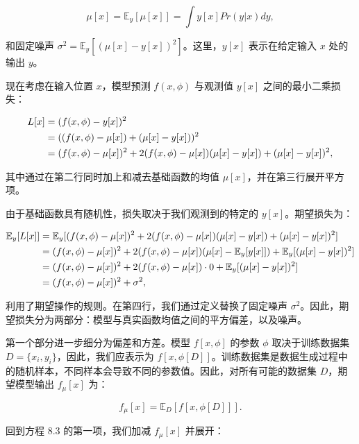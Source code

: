 \documentclass[lang=cn,newtx,10pt,scheme=chinese]{elegantbook}
\begin{document}
\begin{equation}
\mu[x] = \mathbb{E}_y[\mu[x]] = \int y[x] Pr(y|x)dy, 
\end{equation}


和固定噪声 \(\sigma^2 = \mathbb{E}_y [(\mu[x] - y[x])^2]\)。这里，\(y[x]\) 表示在给定输入 \(x\) 处的输出 \(y\)。

现在考虑在输入位置 \(x\)，模型预测 \(f(x, \phi)\) 与观测值 \(y[x]\) 之间的最小二乘损失：


\begin{align}
L[x] &= (f(x, \phi) - y[x])^2 \notag \\
&= ((f(x, \phi) - \mu[x]) + (\mu[x] - y[x]))^2 \notag \\
&= (f(x, \phi) - \mu[x])^2 + 2(f(x, \phi) - \mu[x])(\mu[x] - y[x]) + (\mu[x] - y[x])^2, 
\end{align} 


其中通过在第二行同时加上和减去基础函数的均值 \(\mu[x]\)，并在第三行展开平方项。

由于基础函数具有随机性，损失取决于我们观测到的特定的 \(y[x]\)。期望损失为：

\begin{align}
\mathbb{E}_y[L[x]] &= \mathbb{E}_y[(f(x, \phi) - \mu[x])^2 + 2(f(x, \phi) - \mu[x])(\mu[x] - y[x]) + (\mu[x] - y[x])^2] \notag \\
&= (f(x, \phi) - \mu[x])^2 + 2(f(x, \phi) - \mu[x])(\mu[x] - \mathbb{E}_y[y[x]]) + \mathbb{E}_y[(\mu[x] - y[x])^2] \notag \\
&= (f(x, \phi) - \mu[x])^2 + 2(f(x, \phi) - \mu[x]) \cdot 0 + \mathbb{E}_y[(\mu[x] - y[x])^2] \notag \\
&= (f(x, \phi) - \mu[x])^2 + \sigma^2, 
\end{align} 


利用了期望操作的规则。在第四行，我们通过定义替换了固定噪声 \(\sigma^2\)。因此，期望损失分为两部分：模型与真实函数均值之间的平方偏差，以及噪声。

第一个部分进一步细分为偏差和方差。模型 \(f[x, \phi]\) 的参数 \(\phi\) 取决于训练数据集 \(D = \{x_i, y_i\}\)，因此，我们应表示为 \(f[x, \phi[D]]\)。训练数据集是数据生成过程中的随机样本，不同样本会导致不同的参数值。因此，对所有可能的数据集 \(D\)，期望模型输出 \(f_\mu[x]\) 为：

\begin{equation}
f_\mu[x] = \mathbb{E}_D[f[x, \phi[D]]].
\end{equation}

回到方程 8.3 的第一项，我们加减 \(f_\mu[x]\) 并展开：
\end{document}
